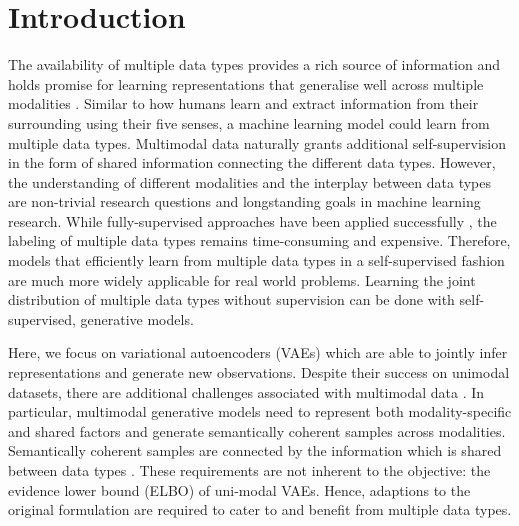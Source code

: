 \section{Introduction}

The availability of multiple data types provides a rich source of information and holds promise for learning representations that generalise well across multiple modalities \parencite{baltrusaitis_multimodal_2019}.
Similar to how humans learn and extract information from their surrounding using their five senses, a machine learning model could learn from multiple data types.
Multimodal data naturally grants additional self-supervision in the form of shared information connecting the different data types.
However, the understanding of different modalities and the interplay between data types are non-trivial research questions and longstanding goals in machine learning research.
While fully-supervised approaches have been applied successfully \parencite{karpathy_deep_2015,tsai_learning_2018}, the labeling of multiple data types remains time-consuming and expensive.
Therefore, models that efficiently learn from multiple data types in a self-supervised fashion are much more widely applicable for real world problems.
Learning the joint distribution of multiple data types without supervision can be done with self-supervised, generative models.

Here, we focus on variational autoencoders (VAEs) \parencite{kingma_auto-encoding_2014,rezende_stochastic_2014} which are able to jointly infer representations and generate new observations.
Despite their success on unimodal datasets, there are additional challenges associated with multimodal data \parencite{suzuki_joint_2016, vedantam_generative_2018}.
In particular, multimodal generative models need to represent both modality-specific and shared factors and generate semantically coherent samples across modalities.
Semantically coherent samples are connected by the information which is shared between data types \parencite{shi_variational_2019}.
These requirements are not inherent to the objective: the evidence lower bound (ELBO) of uni-modal VAEs.
Hence, adaptions to the original formulation are required to cater to and benefit from multiple data types.



